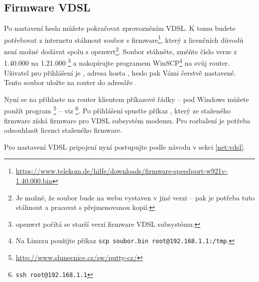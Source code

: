 \subsection{Firmware VDSL}
\label{firstboot:vdslfw}
Po nastavení hesla můžete pokračovat zprovozněním VDSL.
K tomu budete
potřebovat z internetu stáhnout soubor s firmware\footnote{
\url{https://www.telekom.de/hilfe/downloads/firmware-speedport-w921v-1.40.000.bin}},
který z licenčních důvodů není možné dodávat spolu s \gls{openwrt}\footnote{
Je možné, že soubor bude na webu vystaven v jiné verzi -- pak je potřeba tuto
stáhnout a pracovat s přejmenovanou kopií.
}. Soubor stáhněte, změňte číslo verze z 1.40.000 na 1.21.000 \footnote{\gls{openwrt}
\wrtversion počítá se starší verzí firmware VDSL subsystému.}
a nakopírujte programem WinSCP\footnote{Na Linuxu použijte příkaz
{\texttt{scp soubor.bin root@192.168.1.1:/tmp}}.} na svůj router. Uživatel pro přihlášení
je , adresa hosta , heslo pak Vámi čerstvě nastavené.
Tento soubor uložte na router do adresáře .

Nyní se na přihlaste na router klientem příkazové řádky -- pod Windows můžete
použít program \footnote{\url{http://www.slunecnice.cz/sw/putty-cz/}} -- viz \footnote{\texttt{ssh root@192.168.1.1}}.
Po přihlášení spusťte příkaz , který ze staženého firmware
získá firmware pro VDSL subsystém modemu. Pro rozbalení je potřeba odsouhlasit
licenci staženého firmware.

Pro nastavení VDSL pripojení nyní postupujte podle návodu v sekci \ref{net:vdsl}.

